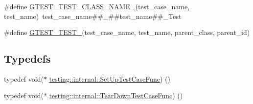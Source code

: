 \begin{DoxyCompactItemize}
\item 
\#define \mbox{\hyperlink{_obj__test_2lib_2googletest-release-1_88_81_2googletest_2include_2gtest_2internal_2gtest-internal_8h_a87a1ee3a3b9b798195236d053f2e5dcc}{G\+T\+E\+S\+T\+\_\+\+T\+E\+S\+T\+\_\+\+C\+L\+A\+S\+S\+\_\+\+N\+A\+M\+E\+\_\+}}(test\+\_\+case\+\_\+name,  test\+\_\+name)~test\+\_\+case\+\_\+name\#\#\+\_\+\#\#test\+\_\+name\#\#\+\_\+\+Test
\item 
\#define \mbox{\hyperlink{_obj__test_2lib_2googletest-release-1_88_81_2googletest_2include_2gtest_2internal_2gtest-internal_8h_ae2d26f0f92fbaf62bf4c1eca45bb2f1f}{G\+T\+E\+S\+T\+\_\+\+T\+E\+S\+T\+\_\+}}(test\+\_\+case\+\_\+name,  test\+\_\+name,  parent\+\_\+class,  parent\+\_\+id)
\end{DoxyCompactItemize}
\subsection*{Typedefs}
\begin{DoxyCompactItemize}
\item 
typedef void($\ast$ \mbox{\hyperlink{namespacetesting_1_1internal_a30037044c0b57cdd647c7e2e97cb2cff}{testing\+::internal\+::\+Set\+Up\+Test\+Case\+Func}}) ()
\item 
typedef void($\ast$ \mbox{\hyperlink{namespacetesting_1_1internal_a085e31321d0d029c04d2a79234f60c1a}{testing\+::internal\+::\+Tear\+Down\+Test\+Case\+Func}}) ()
\end{DoxyCompactItemize}
